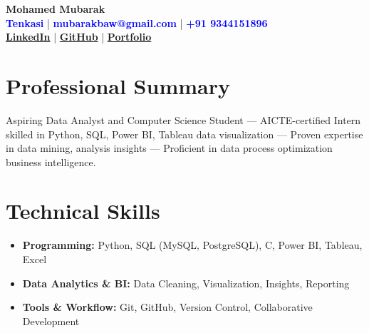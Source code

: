 \documentclass[a4paper,10pt]{article}
\begin{document}
\begin{center}
    {\LARGE \textbf{Mohamed Mubarak}}\\
    \small \textbf{\textcolor{blue}{Tenkasi}} |  
    \textbf{\textcolor{blue}{mubarakbaw@gmail.com}} |  
    \textbf{\textcolor{blue}{+91 9344151896}} \\
    \textbf{\textcolor{graycolor}{\href{https://www.linkedin.com/in/md-mubarak}{LinkedIn}}} |  
    \textbf{\textcolor{graycolor}{\href{https://github.com/Mubarak-04}{GitHub}}} |  
    \textbf{\textcolor{graycolor}{\href{https://mubarak-04.netlify.app/}{Portfolio}}}
\end{center}

\section*{Professional Summary}
Aspiring Data Analyst and Computer Science Student — AICTE-certified Intern skilled in Python, SQL, Power BI, Tableau data visualization — Proven expertise in data mining, analysis insights — Proficient in data process optimization business intelligence.

\section*{Technical Skills}
\begin{itemize}
    \item \textbf{Programming:} Python, SQL (MySQL, PostgreSQL), C, Power BI, Tableau, Excel
    \item \textbf{Data Analytics \& BI:} Data Cleaning, Visualization, Insights, Reporting
    \item \textbf{Tools \& Workflow:} Git, GitHub, Version Control, Collaborative Development
\end{itemize}

\end{document}
